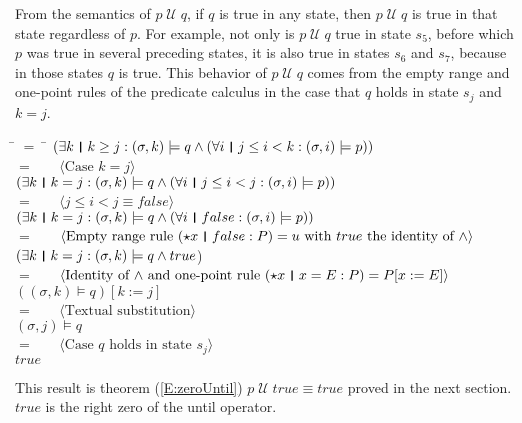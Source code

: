 \documentclass[fleqn, leqno]{article}
\newcommand{\lgap}{2pt}                             %
\newcommand{\mymathindent}{24pt}                    %
\newcommand{\Until}{\;\mathcal{U}\;}
\newcommand{\thedr}{\rule[-.25ex]{.32mm}{1.75ex}}   %
\newcommand{\dr}{\;\,\thedr\,\;}                    %
\newcommand{\rb}{:}                                 %
\newcommand{\all}{\forall}                          %
\newcommand{\ext}{\exists}                          %
\newcommand{\Gll} {\langle}                         %
\newcommand{\Ggg} {\rangle}                         %
\newcommand{\Hint}[1]     {\ \ \ $\Gll              \mbox{#1} \Ggg$ }   %
\begin{document}
From the semantics of $p\Until q$, if $q$ is true in any state, then $p\Until q$ is true in that state regardless of $p$.
For example, not only is $p\Until q$ true in state $s_5$, before which $p$ was true in several preceding states,
it is also true in states $s_6$ and $s_7$, because in those states $q$ is true.
This behavior of $p\Until q$ comes from the empty range and one-point rules \cite{LADM} of the predicate calculus in the case that
$q$ holds in state $s_j$ and $k=j$.

\begin{tabbing}
\hspace{\mymathindent} \= $= \;$ \= \kill
	\> \>   $(\ext k \dr k \ge j \rb (\sigma,k) \models q \land (\all i \dr j\le i < k \rb (\sigma,i) \models p))$\\[\lgap]
	\> $=$  \>  \Hint{Case $k=j$}\\[\lgap]
	\> \>   $(\ext k \dr k=j \rb (\sigma,k) \models q \land (\all i \dr j\le i < j \rb (\sigma,i) \models p))$\\[\lgap]
	\> $=$  \>  \Hint{$j\le i < j \equiv false$}\\[\lgap]
	\> \>   $(\ext k \dr k=j \rb (\sigma,k) \models q \land (\all i \dr false \rb (\sigma,i) \models p))$\\[\lgap]
	\> $=$  \>  \Hint{Empty range rule $(\star x \dr false \rb P) =u$ with $true$ the identity of $\land$}\\[\lgap]
	\> \>   $(\ext k \dr k=j \rb (\sigma,k) \models q \land true$)\\[\lgap]
	\> $=$  \>  \Hint{Identity of $\land$ and one-point rule $(\star x\dr x=E\rb P) = P[x:=E]$}\\[\lgap]
	\> \>   $((\sigma,k) \models q)[k := j]$\\[\lgap]
	\> $=$  \>  \Hint{Textual substitution}\\[\lgap]
	\> \>   $(\sigma,j) \models q$\\[\lgap]
	\> $=$  \>  \Hint{Case $q$ holds in state $s_j$}\\[\lgap]
	\> \>   $true$
\end{tabbing}

This result is theorem (\ref{E:zeroUntil}) $p \Until true \equiv true$ proved in the next section.
$true$ is the right zero of the until operator.\\
\end{document}
